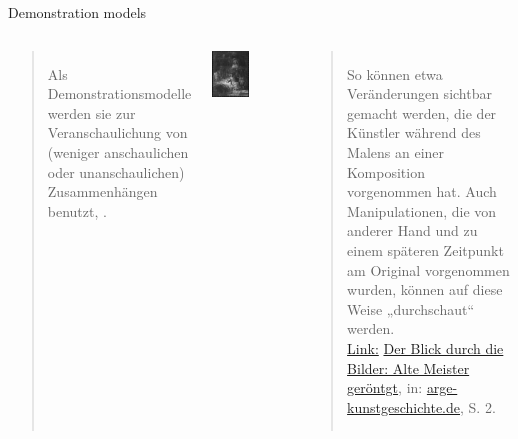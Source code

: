 \begin{frame}{Demonstration models}
  \begin{columns}%
         \begin{quote}
        Als Demonstrationsmodelle werden sie zur
Veranschaulichung von (weniger anschaulichen oder
unanschaulichen) Zusammenhängen benutzt, \punkti.~\parencite[138]{stachowiak}
    \end{quote}\bigskip
    
    {\hfill \includegraphics[width=0.5\textwidth]{img/demonstrationsmodell.png} \hfill}
    \begin{quote}
        So können etwa Veränderungen sichtbar gemacht
werden, die der Künstler während des Malens an einer
Komposition vorgenommen hat. Auch Manipulationen, die
von anderer Hand und zu einem späteren Zeitpunkt am
Original vorgenommen wurden, können auf diese Weise
„durchschaut“ werden.\\
{\scriptsize \href{https://web.archive.org/web/20140912212745/}{Link:} \href{http://www.arge-
kunstgeschichte.de/fileadmin/user\_upload/pdf/Der\_Blick\_durch\_die\_Bilder.pdf }{Der Blick durch die Bilder: Alte Meister geröntgt}, in: \protect\url{arge-kunstgeschichte.de}, S. 2.}
    \end{quote}

  \end{columns}
\end{frame}



